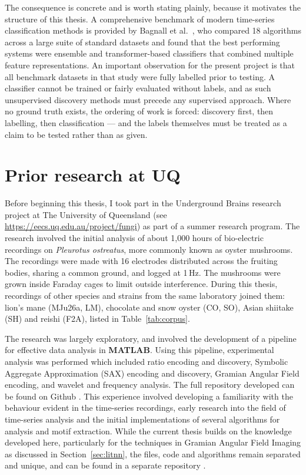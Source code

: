 The consequence is concrete and is worth stating plainly, because it motivates the structure of this thesis. A comprehensive benchmark of modern time-series classification methods is provided by Bagnall et al.\ \cite{bagnall}, who compared 18 algorithms across a large suite of standard datasets and found that the best performing systems were ensemble and transformer-based classifiers that combined multiple feature representations. An important observation for the present project is that all benchmark datasets in that study were fully labelled prior to testing. A classifier cannot be trained or fairly evaluated without labels, and as such unsupervised discovery methods must precede any supervised approach. Where no ground truth exists, the ordering of work is forced: discovery first, then labelling, then classification --- and the labels themselves must be treated as a claim to be tested rather than as given.

\section{Prior research at UQ}
\label{sec:lituq}

Before beginning this thesis, I took part in the Underground Brains research project at The University of Queensland (see \url{https://eecs.uq.edu.au/project/fungi}) as part of a summer research program. The research involved the initial analysis of about 1,000 hours of bio-electric recordings on \emph{Pleurotus ostreatus}, more commonly known as oyster mushrooms. The recordings were made with 16 electrodes distributed across the fruiting bodies, sharing a common ground, and logged at 1\,Hz. The mushrooms were grown inside Faraday cages to limit outside interference. During this thesis, recordings of other species and strains from the same laboratory joined them: lion's mane (MJu26a, LM), chocolate and snow oyster (CO, SO), Asian shiitake (SH) and reishi (F2A), listed in Table~\ref{tab:corpus}.

The research was largely exploratory, and involved the development of a pipeline for effective data analysis in \textbf{MATLAB}. Using this pipeline, experimental analysis was performed which included ratio encoding and discovery, Symbolic Aggregate Approximation (SAX) encoding and discovery, Gramian Angular Field encoding, and wavelet and frequency analysis. The full repository developed can be found on Github \cite{summerrepo}. This experience involved developing a familiarity with the behaviour evident in the time-series recordings, early research into the field of time-series analysis and the initial implementations of several algorithms for analysis and motif extraction. While the current thesis builds on the knowledge developed here, particularly for the techniques in Gramian Angular Field Imaging as discussed in Section~\ref{sec:litnn}, the files, code and algorithms remain separated and unique, and can be found in a separate repository \cite{thesisrepo}.


